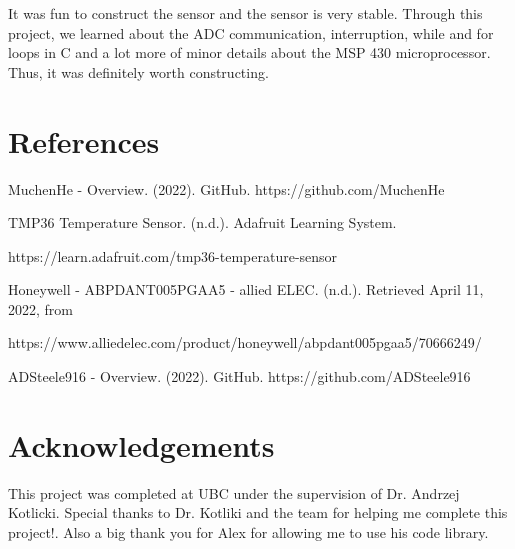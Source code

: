 \documentclass{article}
\begin{document}
It was fun to construct the sensor and the sensor is very stable.  Through this project, we learned about the ADC communication, interruption, while and for loops in C and a lot more of minor details about the MSP 430 microprocessor. Thus, it was definitely worth constructing.

\section{References}

\noindent [1] MuchenHe - Overview. (2022). GitHub. https://github.com/MuchenHe

\noindent [2] TMP36 Temperature Sensor. (n.d.). Adafruit Learning System. 

\noindent https://learn.adafruit.com/tmp36-temperature-sensor

\noindent [3]Honeywell - ABPDANT005PGAA5 - allied ELEC. (n.d.). Retrieved April 11, 2022, from

\noindent https://www.alliedelec.com/product/honeywell/abpdant005pgaa5/70666249/ 

\noindent [4]ADSteele916 - Overview. (2022). GitHub. https://github.com/ADSteele916

\section{Acknowledgements} 
This project was completed at UBC under the supervision of Dr. Andrzej Kotlicki. Special thanks to Dr. Kotliki and the team for helping me complete this project!. Also a big thank you for Alex for allowing me to use his code library. 
\end{document}
